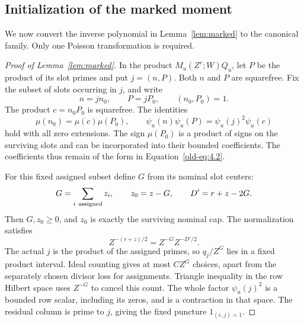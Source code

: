 \documentclass[11pt,a4paper]{article}
\numberwithin{equation}{section}
\numberwithin{figure}{section}
\theoremstyle{definition}
\theoremstyle{remark}
\begin{document}
\subsection{Initialization of the marked moment}

We now convert the inverse polynomial in Lemma~\ref{lem:marked} to
the canonical family.  Only one Poisson transformation is required.

\begin{proof}[Proof of Lemma~\ref{lem:marked}]
In the product \(M_u(Z^r;W)Q_u\), let \(P\) be the product of its
slot primes and put \(j=(n,P)\).  Both \(n\) and \(P\) are
squarefree.  Fix the subset of slots occurring in \(j\), and write
\[
 n=jn_0,\qquad P=jP_0,\qquad (n_0,P_0)=1.
\]
The product \(c=n_0P_0\) is squarefree.  The identities
\[
 \mu(n_0)=\mu(c)\mu(P_0),\qquad
 \psi_u(n)\psi_u(P)=\psi_u(j)^2\psi_u(c)
\]
hold with all zero extensions.  The sign \(\mu(P_0)\) is a product
of signs on the surviving slots and can be incorporated into their
bounded coefficients.  The coefficients thus remain of the form
in Equation~\eqref{old-eq:4.2}.

For this fixed assigned subset define \(G\) from its nominal slot centers:
\[
 G=\sum_{i\ {\rm assigned}}z_i,\qquad
 z_0=z-G,\qquad D'=r+z-2G.
\]
Then \(G,z_0\ge0\), and \(z_0\) is exactly the surviving nominal cap.
The normalization satisfies
\[
 Z^{-(r+z)/2}=Z^{-G}Z^{-D'/2}.
\]
The actual \(j\) is the product of the assigned primes, so
\(q_j/Z^G\) lies in a fixed product interval.  Ideal counting gives at
most \(CZ^G\) choices, apart from the separately chosen divisor loss
for assignments.  Triangle inequality in the row Hilbert space uses
\(Z^{-G}\) to cancel this count.  The whole factor \(\psi_u(j)^2\) is a
bounded row scalar, including its zeros, and is a contraction in that
space.  The residual column is prime to \(j\), giving the fixed
puncture \(1_{(c,j)=1}\).


\end{proof}
\end{document}
